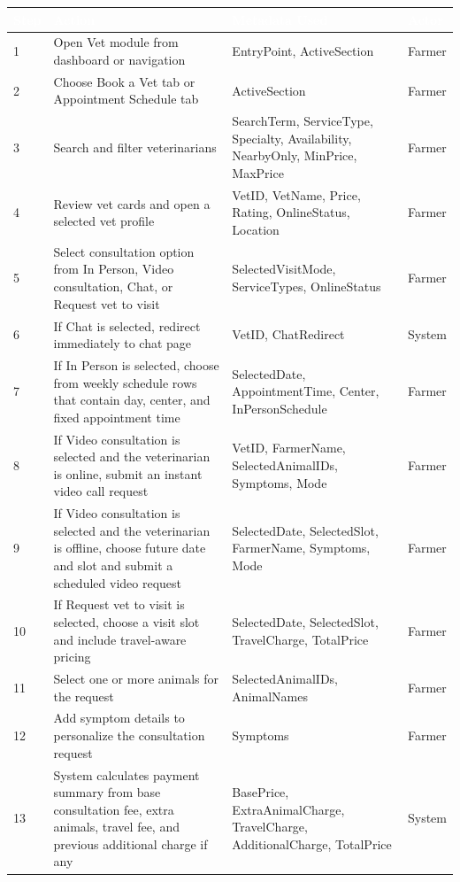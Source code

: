 \documentclass[12pt]{article}
\begin{document}
\begin{longtable}{|p{1.2cm}|p{5.6cm}|p{5.7cm}|p{2cm}|}
\hline
\rowcolor{headerblue}\textcolor{white}{\textbf{Step}} & \textcolor{white}{\textbf{Action}} & \textcolor{white}{\textbf{Metadata Used}} & \textcolor{white}{\textbf{Actor}} \\
\hline
1 & Open Vet module from dashboard or navigation & EntryPoint, ActiveSection & Farmer \\
\hline
\rowcolor{rowgray}
2 & Choose Book a Vet tab or Appointment Schedule tab & ActiveSection & Farmer \\
\hline
3 & Search and filter veterinarians & SearchTerm, ServiceType, Specialty, Availability, NearbyOnly, MinPrice, MaxPrice & Farmer \\
\hline
\rowcolor{rowgray}
4 & Review vet cards and open a selected vet profile & VetID, VetName, Price, Rating, OnlineStatus, Location & Farmer \\
\hline
5 & Select consultation option from In Person, Video consultation, Chat, or Request vet to visit & SelectedVisitMode, ServiceTypes, OnlineStatus & Farmer \\
\hline
\rowcolor{rowgray}
6 & If Chat is selected, redirect immediately to chat page & VetID, ChatRedirect & System \\
\hline
7 & If In Person is selected, choose from weekly schedule rows that contain day, center, and fixed appointment time & SelectedDate, AppointmentTime, Center, InPersonSchedule & Farmer \\
\hline
\rowcolor{rowgray}
8 & If Video consultation is selected and the veterinarian is online, submit an instant video call request & VetID, FarmerName, SelectedAnimalIDs, Symptoms, Mode & Farmer \\
\hline
9 & If Video consultation is selected and the veterinarian is offline, choose future date and slot and submit a scheduled video request & SelectedDate, SelectedSlot, FarmerName, Symptoms, Mode & Farmer \\
\hline
\rowcolor{rowgray}
10 & If Request vet to visit is selected, choose a visit slot and include travel-aware pricing & SelectedDate, SelectedSlot, TravelCharge, TotalPrice & Farmer \\
\hline
11 & Select one or more animals for the request & SelectedAnimalIDs, AnimalNames & Farmer \\
\hline
\rowcolor{rowgray}
12 & Add symptom details to personalize the consultation request & Symptoms & Farmer \\
\hline
13 & System calculates payment summary from base consultation fee, extra animals, travel fee, and previous additional charge if any & BasePrice, ExtraAnimalCharge, TravelCharge, AdditionalCharge, TotalPrice & System \\

\end{longtable}
\end{document}
